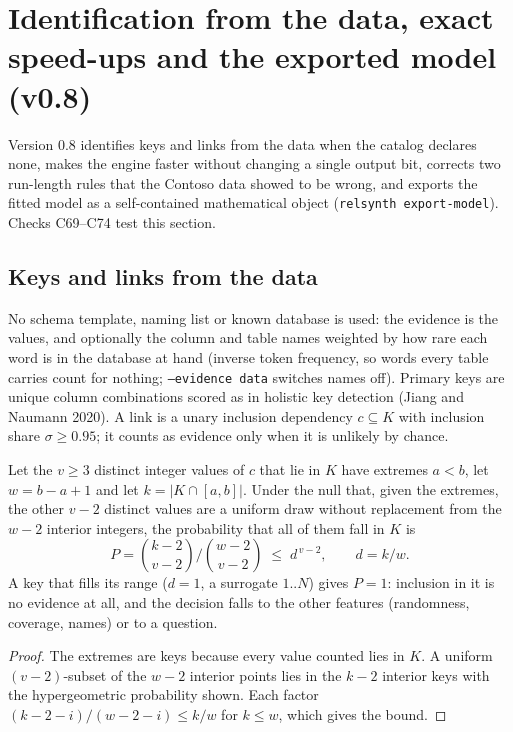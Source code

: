 \section{Identification from the data, exact speed-ups and the exported model (v0.8)}\label{sec:v08}
Version 0.8 identifies keys and links from the data when the catalog declares none, makes the engine faster without changing a single output bit, corrects two run-length rules that the Contoso data showed to be wrong, and exports the fitted model as a self-contained mathematical object (\texttt{relsynth export-model}). Checks C69--C74 test this section.

\subsection{Keys and links from the data}
No schema template, naming list or known database is used: the evidence is the values, and optionally the column and table names weighted by how rare each word is in the database at hand (inverse token frequency, so words every table carries count for nothing; \texttt{--evidence data} switches names off). Primary keys are unique column combinations scored as in holistic key detection (Jiang and Naumann 2020). A link is a unary inclusion dependency $c\subseteq K$ with inclusion share $\sigma\ge0.95$; it counts as evidence only when it is unlikely by chance.

\begin{proposition}\label{prop:inclchance}
Let the $v\ge3$ distinct integer values of $c$ that lie in $K$ have extremes $a<b$, let $w=b-a+1$ and let $k=|K\cap[a,b]|$. Under the null that, given the extremes, the other $v-2$ distinct values are a uniform draw without replacement from the $w-2$ interior integers, the probability that all of them fall in $K$ is
\[P=\binom{k-2}{v-2}\Big/\binom{w-2}{v-2}\;\le\;d^{\,v-2},\qquad d=k/w.\]
A key that fills its range ($d=1$, a surrogate $1..N$) gives $P=1$: inclusion in it is no evidence at all, and the decision falls to the other features (randomness, coverage, names) or to a question.
\end{proposition}
\begin{proof}
The extremes are keys because every value counted lies in $K$. A uniform $(v-2)$-subset of the $w-2$ interior points lies in the $k-2$ interior keys with the hypergeometric probability shown. Each factor $(k-2-i)/(w-2-i)\le k/w$ for $k\le w$, which gives the bound.
\end{proof}

